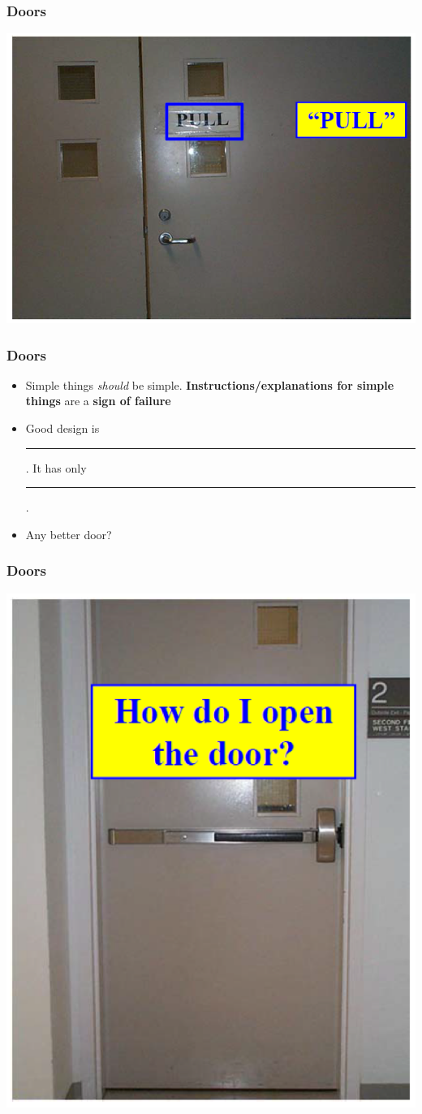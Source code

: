 \documentclass{beamer}
\begin{document}
\begin{frame}
\frametitle{Doors}
\centering
\includegraphics[width=0.8\linewidth]{door4}
\end{frame}

\begin{frame}
\frametitle{Doors}
\begin{itemize}
\item  Simple things \textit{should} be simple. \textbf{Instructions/explanations for simple things} are a \textbf{sign of failure}
\item Good design is \rule{2cm}{0.15mm}.   It has only \rule{2cm}{0.15mm}.
\item Any better door?
\end{itemize}
\end{frame}

\begin{frame}
\frametitle{Doors}
\centering
\includegraphics[width=.45\linewidth]{door5}
\end{frame}
\end{document}
